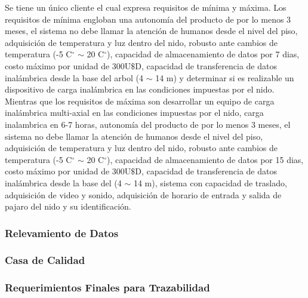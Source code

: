 Se tiene un único cliente el cual expresa requisitos de mínima y máxima. Los requisitos de mínima engloban una autonomía del producto de por lo menos 3 meses, el sistema no debe llamar la atención de humanos desde el nivel del piso, adquisición de temperatura y luz dentro del nido, robusto ante cambios de temperatura (-5 C$^{\circ}$ $\sim$ 20 C$^{\circ}$), capacidad de almacenamiento de datos por 7 dias, costo máximo por unidad de 300U$\$ $D, capacidad de transferencia de datos inalámbrica desde la base del arbol (4 $\sim$ 14 m) y determinar si es realizable un dispositivo de carga inalámbrica en las condiciones impuestas por el nido. Mientras que los requisitos de máxima son 
desarrollar un equipo de carga inalámbrica multi-axial en las condiciones impuestas por el nido, carga inalambrica en 6-7 horas, autonomía del producto de por lo menos 3 meses, el sistema no debe llamar la atención de humanos desde el nivel del piso, adquisición de temperatura y luz dentro del nido, robusto ante cambios de temperatura (-5 C$^{\circ}$ $\sim$ 20 C$^{\circ}$), capacidad de almacenamiento de datos por 15 dias, costo máximo por unidad de 300U$\$ $D, capacidad de transferencia de datos inalámbrica desde la base del   (4 $\sim$ 14 m), sistema con capacidad de traslado, adquisición de video y sonido, adquisición de horario de entrada y salida de pajaro del nido y su identificación.

\subsubsection{Relevamiento de Datos}
\label{sec:RelevamientoDatos}


\subsubsection{Casa de Calidad}
\label{sec:CasaCalidad}


\subsubsection{Requerimientos Finales para Trazabilidad}
\label{sec:RequerimientosTrazabilidad}

